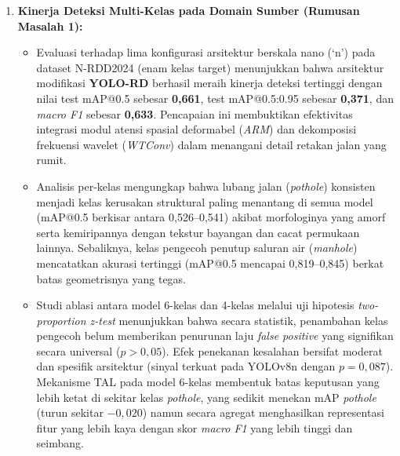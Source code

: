 \begin{enumerate}
	\item \textbf{Kinerja Deteksi Multi-Kelas pada Domain Sumber (Rumusan Masalah 1):}
	\begin{itemize}
		\item Evaluasi terhadap lima konfigurasi arsitektur berskala nano (`n') pada dataset N-RDD2024 (enam kelas target) menunjukkan bahwa arsitektur modifikasi \textbf{YOLO-RD} berhasil meraih kinerja deteksi tertinggi dengan nilai test mAP@0.5 sebesar \textbf{0,661}, test mAP@0.5:0.95 sebesar \textbf{0,371}, dan \textit{macro F1} sebesar \textbf{0,633}. Pencapaian ini membuktikan efektivitas integrasi modul atensi spasial deformabel (\textit{ARM}) dan dekomposisi frekuensi wavelet (\textit{WTConv}) dalam menangani detail retakan jalan yang rumit.
		\item Analisis per-kelas mengungkap bahwa lubang jalan (\textit{pothole}) konsisten menjadi kelas kerusakan struktural paling menantang di semua model (mAP@0.5 berkisar antara 0,526--0,541) akibat morfologinya yang amorf serta kemiripannya dengan tekstur bayangan dan cacat permukaan lainnya. Sebaliknya, kelas pengecoh penutup saluran air (\textit{manhole}) mencatatkan akurasi tertinggi (mAP@0.5 mencapai 0,819--0,845) berkat batas geometrisnya yang tegas.
		\item Studi ablasi antara model 6-kelas dan 4-kelas melalui uji hipotesis \textit{two-proportion z-test} menunjukkan bahwa secara statistik, penambahan kelas pengecoh belum memberikan penurunan laju \textit{false positive} yang signifikan secara universal ($p > 0,05$). Efek penekanan kesalahan bersifat moderat dan spesifik arsitektur (sinyal terkuat pada YOLOv8n dengan $p = 0,087$). Mekanisme TAL pada model 6-kelas membentuk batas keputusan yang lebih ketat di sekitar kelas \textit{pothole}, yang sedikit menekan mAP \textit{pothole} (turun sekitar $-0,020$) namun secara agregat menghasilkan representasi fitur yang lebih kaya dengan skor \textit{macro F1} yang lebih tinggi dan seimbang.
	\end{itemize}


\end{enumerate}
